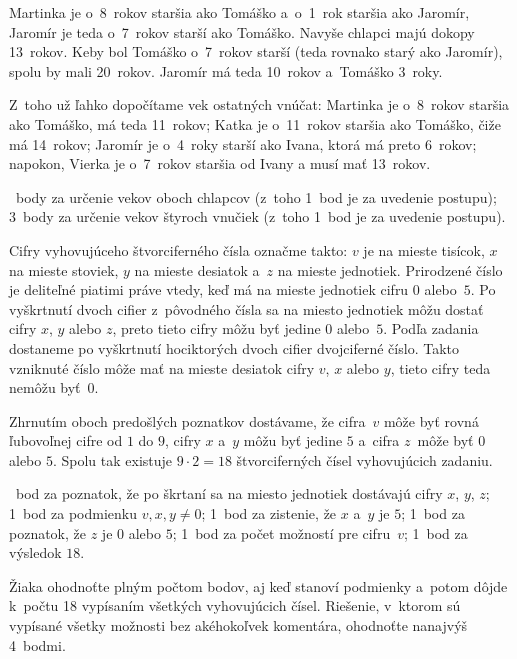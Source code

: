 {%
Martinka je o~8~rokov staršia ako Tomáško a~o~1~rok staršia ako Jaromír,
Jaromír je teda o~7~rokov starší ako Tomáško.
Navyše chlapci majú dokopy 13~rokov.
Keby bol Tomáško o~7~rokov starší (teda rovnako starý ako Jaromír), spolu by
mali 20~rokov.
Jaromír má teda 10~rokov a~Tomáško 3~roky.

Z~toho už ľahko dopočítame vek ostatných vnúčat:
Martinka je o~8~rokov staršia ako Tomáško, má teda 11~rokov;
Katka je o~11~rokov staršia ako Tomáško, čiže má 14~rokov;
Jaromír je o~4~roky starší ako Ivana, ktorá má preto 6~rokov; napokon,
Vierka je o~7~rokov staršia od Ivany a musí mať 13~rokov.

~body za určenie vekov oboch chlapcov (z~toho 1~bod je za uvedenie postupu);
3~body za určenie vekov štyroch vnučiek (z~toho 1~bod je za uvedenie postupu).
\endhodnotenie
}

{%
Cifry vyhovujúceho štvorciferného čísla označme takto:
$v$ je na mieste tisícok,
$x$ na mieste stoviek,
$y$ na mieste desiatok a~$z$ na mieste jednotiek.
Prirodzené číslo je deliteľné piatimi práve vtedy, keď má na mieste jednotiek cifru $0$
alebo~$5$.
Po vyškrtnutí dvoch cifier z~pôvodného čísla sa na miesto jednotiek môžu
dostať cifry $x$, $y$ alebo $z$, preto tieto cifry môžu byť jedine $0$
alebo~$5$.
Podľa zadania dostaneme po vyškrtnutí hociktorých dvoch cifier dvojciferné
číslo.
Takto vzniknuté číslo môže mať na mieste desiatok cifry $v$, $x$ alebo $y$,
tieto cifry teda nemôžu byť~$0$.

Zhrnutím oboch predošlých poznatkov dostávame, že cifra~$v$ môže byť rovná ľubovoľnej
cifre od $1$ do $9$, cifry $x$ a~$y$ môžu byť jedine $5$ a~cifra $z$~môže
byť $0$ alebo $5$.
Spolu tak existuje $9\cdot 2 =18$ štvorciferných čísel vyhovujúcich zadaniu.

~bod za poznatok, že po škrtaní sa na miesto jednotiek dostávajú cifry $x$,
$y$, $z$;
1~bod za podmienku $v,x,y\ne 0$;
1~bod za zistenie, že $x$ a~$y$ je $5$;
1~bod za poznatok, že $z$ je $0$ alebo $5$;
1~bod za počet možností pre cifru~$v$;
1~bod za výsledok $18$.

Žiaka ohodnoťte plným počtom bodov, aj keď stanoví podmienky a~potom dôjde k~počtu 18 vypísaním všetkých vyhovujúcich čísel.
Riešenie, v~ktorom sú vypísané všetky možnosti bez akéhokoľvek komentára,
ohodnoťte nanajvýš 4~bodmi.
\endhodnotenie
}

